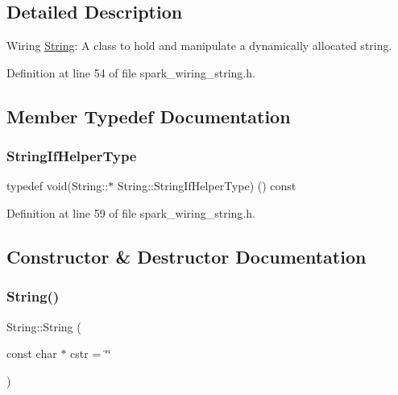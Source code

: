 \subsection{Detailed Description}
Wiring \hyperlink{class_string}{String}\+: A class to hold and manipulate a dynamically allocated string. 

Definition at line 54 of file spark\+\_\+wiring\+\_\+string.\+h.



\subsection{Member Typedef Documentation}
\mbox{\label{class_string_a2f31c4cd9dab650141b50a8350a1ffd4}} 
\subsubsection{\texorpdfstring{String\+If\+Helper\+Type}{StringIfHelperType}}
{\footnotesize\ttfamily typedef void(String\+::$\ast$ String\+::\+String\+If\+Helper\+Type) () const\hspace{0.3cm}{\ttfamily [private]}}



Definition at line 59 of file spark\+\_\+wiring\+\_\+string.\+h.



\subsection{Constructor \& Destructor Documentation}
\mbox{\label{class_string_a9c6238ddd5e2dca198ead5227fc7b858}} 
\subsubsection{\texorpdfstring{String()}{String()}\hspace{0.1cm}{\footnotesize\ttfamily [1/13]}}
{\footnotesize\ttfamily String\+::\+String (\begin{DoxyParamCaption}\item[{const char $\ast$}]{cstr = {\ttfamily \char`\"{}\char`\"{}} }\end{DoxyParamCaption})}



